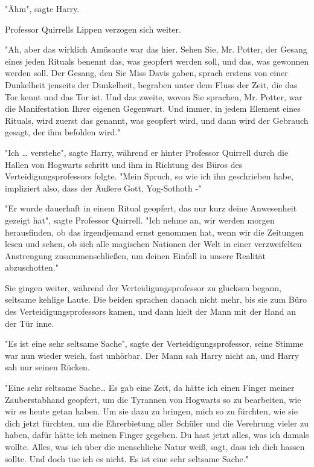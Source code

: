 {"Ähm", sagte Harry.

Professor Quirrells Lippen verzogen sich weiter.

"Ah, aber das wirklich Amüsante war das hier. Sehen Sie, Mr. Potter, der Gesang eines jeden Rituals benennt das, was geopfert werden soll, und das, was gewonnen werden soll. Der Gesang, den Sie Miss Davis gaben, sprach erstens von einer Dunkelheit jenseits der Dunkelheit, begraben unter dem Fluss der Zeit, die das Tor kennt und das Tor ist. Und das zweite, wovon Sie sprachen, Mr. Potter, war die Manifestation Ihrer eigenen Gegenwart. Und immer, in jedem Element eines Rituals, wird zuerst das genannt, was geopfert wird, und dann wird der Gebrauch gesagt, der ihm befohlen wird."

"Ich … verstehe", sagte Harry, während er hinter Professor Quirrell durch die Hallen von Hogwarts schritt und ihm in Richtung des Büros des Verteidigungsprofessors folgte. "Mein Spruch, so wie ich ihn geschrieben habe, impliziert also, dass der Äußere Gott, Yog-Sothoth -"

"Er wurde dauerhaft in einem Ritual geopfert, das nur kurz deine Anwesenheit gezeigt hat", sagte Professor Quirrell. "Ich nehme an, wir werden morgen herausfinden, ob das irgendjemand ernst genommen hat, wenn wir die Zeitungen lesen und sehen, ob sich alle magischen Nationen der Welt in einer verzweifelten Anstrengung zusammenschließen, um deinen Einfall in unsere Realität abzuschotten."

Sie gingen weiter, während der Verteidigungsprofessor zu glucksen begann, seltsame kehlige Laute. Die beiden sprachen danach nicht mehr, bis sie zum Büro des Verteidigungsprofessors kamen, und dann hielt der Mann mit der Hand an der Tür inne.

"Es ist eine sehr seltsame Sache", sagte der Verteidigungsprofessor, seine Stimme war nun wieder weich, fast unhörbar. Der Mann sah Harry nicht an, und Harry sah nur seinen Rücken.

"Eine sehr seltsame Sache… Es gab eine Zeit, da hätte ich einen Finger meiner Zauberstabhand geopfert, um die Tyrannen von Hogwarts so zu bearbeiten, wie wir es heute getan haben. Um sie dazu zu bringen, mich so zu fürchten, wie sie dich jetzt fürchten, um die Ehrerbietung aller Schüler und die Verehrung vieler zu haben, dafür hätte ich meinen Finger gegeben. Du hast jetzt alles, was ich damals wollte. Alles, was ich über die menschliche Natur weiß, sagt, dass ich dich hassen sollte. Und doch tue ich es nicht. Es ist eine sehr seltsame Sache."

}
